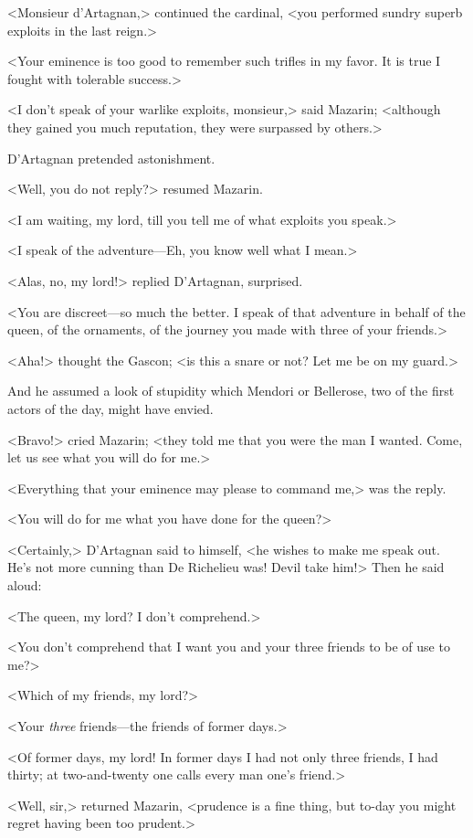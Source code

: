 <Monsieur d'Artagnan,> continued the cardinal, <you performed sundry superb exploits in the last reign.>

<Your eminence is too good to remember such trifles in my favor. It is true I fought with tolerable success.>

<I don't speak of your warlike exploits, monsieur,> said Mazarin; <although they gained you much reputation, they were surpassed by others.>

D'Artagnan pretended astonishment.

<Well, you do not reply?> resumed Mazarin.

<I am waiting, my lord, till you tell me of what exploits you speak.>

<I speak of the adventure—Eh, you know well what I mean.>

<Alas, no, my lord!> replied D'Artagnan, surprised.

<You are discreet—so much the better. I speak of that adventure in behalf of the queen, of the ornaments, of the journey you made with three of your friends.>

<Aha!> thought the Gascon; <is this a snare or not? Let me be on my guard.>

And he assumed a look of stupidity which Mendori or Bellerose, two of the first actors of the day, might have envied.

<Bravo!> cried Mazarin; <they told me that you were the man I wanted. Come, let us see what you will do for me.>

<Everything that your eminence may please to command me,> was the reply.

<You will do for me what you have done for the queen?>

<Certainly,> D'Artagnan said to himself, <he wishes to make me speak out. He's not more cunning than De Richelieu was! Devil take him!> Then he said aloud:

<The queen, my lord? I don't comprehend.>

<You don't comprehend that I want you and your three friends to be of use to me?>

<Which of my friends, my lord?>

<Your \textit{three} friends—the friends of former days.>

<Of former days, my lord! In former days I had not only three friends, I had thirty; at two-and-twenty one calls every man one's friend.>

<Well, sir,> returned Mazarin, <prudence is a fine thing, but to-day you might regret having been too prudent.>

